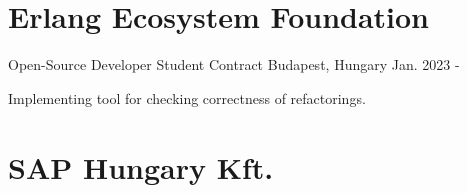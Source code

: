 
\section*{Erlang Ecosystem Foundation}

\begin{cventries}

  \cventry
    {Open-Source Developer} %
    {Student Contract}
    {Budapest, Hungary} %
    {Jan. 2023 - } %
    {
      \begin{cvitems} %
        \item {Implementing tool for checking correctness of refactorings.}
      \end{cvitems}
    }

\end{cventries}

\section*{SAP Hungary Kft.}


